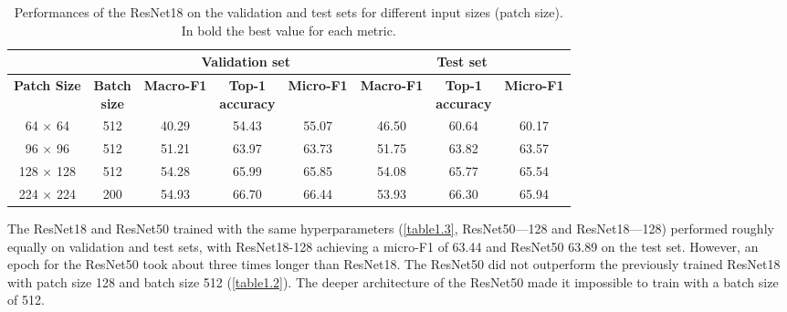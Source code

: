 \begin{table}[htbp]
  \centering
  \normalsize
  \caption[Performances of the ResNet18 on the validation and test sets for different input sizes]{Performances of the ResNet18 on the validation and test sets for different input sizes (patch size). In bold the best value for each metric.}
  \label{table1.2}
    \begin{tabular}{*{2}{c}|*{3}{c}|*{3}{c}}
        \toprule
        \multicolumn{2}{c}{\textbf{}}             & \multicolumn{3}{c}{\textbf{Validation set}}                     & \multicolumn{3}{c}{\textbf{Test set}}                           \\ 
        \midrule
        \textbf{Patch Size} & \makecell{\textbf{Batch} \\ \textbf{size}} & \textbf{Macro-F1} & \makecell{\textbf{Top-1} \\ \textbf{accuracy}} & \textbf{Micro-F1} & \textbf{Macro-F1} & \makecell{\textbf{Top-1} \\ \textbf{accuracy}} & \textbf{Micro-F1} \\ \midrule
        64 × 64             & 512                 & 40.29             & 54.43                   & 55.07             & 46.50             & 60.64                   & 60.17             \\
        96 × 96             & 512                 & 51.21             & 63.97                   & 63.73             & 51.75             & 63.82                   & 63.57             \\
        128 × 128           & 512                 & 54.28             & 65.99                   & 65.85             & 54.08             & 65.77                   & 65.54             \\
        224 × 224           & 200                 & 54.93             & 66.70                   & 66.44             & 53.93             & 66.30                   & 65.94             \\ \bottomrule
    \end{tabular}
\end{table}

The ResNet18 and ResNet50 trained with the same hyperparameters  (\autoref{table1.3}, ResNet50---128 and ResNet18---128) performed roughly equally on validation and test sets, with ResNet18-128 achieving a micro-F1 of 63.44 and ResNet50 63.89 on the test set. However, an epoch for the ResNet50 took about three times longer than ResNet18. The ResNet50 did not outperform the previously trained ResNet18 with patch size 128 and batch size 512 (\autoref{table1.2}). The deeper architecture of the ResNet50 made it impossible to train with a batch size of 512.

